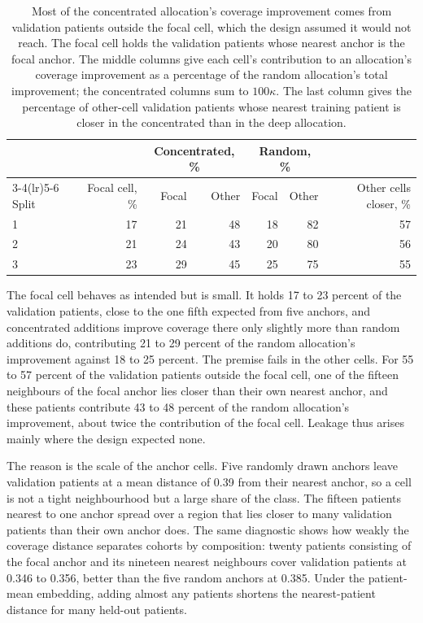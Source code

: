 \begin{table}[htbp]
\centering
\renewcommand{\arraystretch}{1.15}
\begin{tabular}{@{}lrrrrrr@{}}
\toprule
 & & \multicolumn{2}{c}{Concentrated, \%} & \multicolumn{2}{c}{Random, \%} & \\
\cmidrule(lr){3-4}\cmidrule(lr){5-6}
Split & Focal cell, \% & Focal & Other & Focal & Other & Other cells closer, \% \\
\midrule
1 & 17 & 21 & 48 & 18 & 82 & 57 \\
2 & 21 & 24 & 43 & 20 & 80 & 56 \\
3 & 23 & 29 & 45 & 25 & 75 & 55 \\
\bottomrule
\end{tabular}
\caption{Most of the concentrated allocation's coverage improvement comes from validation patients outside the focal cell, which the design assumed it would not reach. The focal cell holds the validation patients whose nearest anchor is the focal anchor. The middle columns give each cell's contribution to an allocation's coverage improvement as a percentage of the random allocation's total improvement; the concentrated columns sum to $100\kappa$. The last column gives the percentage of other-cell validation patients whose nearest training patient is closer in the concentrated than in the deep allocation.}
\label{tab:decomposition}
\end{table}

\noindent The focal cell behaves as intended but is small. It holds 17 to 23 percent of the validation patients, close to the one fifth expected from five anchors, and concentrated additions improve coverage there only slightly more than random additions do, contributing 21 to 29 percent of the random allocation's improvement against 18 to 25 percent. The premise fails in the other cells. For 55 to 57 percent of the validation patients outside the focal cell, one of the fifteen neighbours of the focal anchor lies closer than their own nearest anchor, and these patients contribute 43 to 48 percent of the random allocation's improvement, about twice the contribution of the focal cell. Leakage thus arises mainly where the design expected none.

The reason is the scale of the anchor cells. Five randomly drawn anchors leave validation patients at a mean distance of 0.39 from their nearest anchor, so a cell is not a tight neighbourhood but a large share of the class. The fifteen patients nearest to one anchor spread over a region that lies closer to many validation patients than their own anchor does. The same diagnostic shows how weakly the coverage distance separates cohorts by composition: twenty patients consisting of the focal anchor and its nineteen nearest neighbours cover validation patients at 0.346 to 0.356, better than the five random anchors at 0.385. Under the patient-mean embedding, adding almost any patients shortens the nearest-patient distance for many held-out patients.

